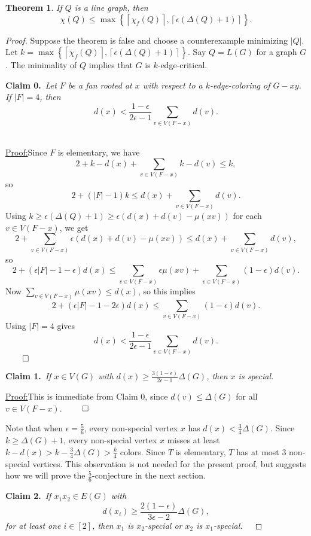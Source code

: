 \documentclass[12pt]{amsart}
\theoremstyle{plain}
\newtheorem{thm}{Theorem}
\theoremstyle{definition}
\theoremstyle{remark}
\newcommand{\set}[1]{\left\{ #1 \right\}}
\newcommand{\card}[1]{\left|#1\right|}
\newcommand{\ceil}[1]{\left\lceil#1\right\rceil}
\newcommand{\irange}[1]{\left[#1\right]}
\newcommand{\parens}[1]{\left( #1 \right)}
\newcommand{\claim}[2]{{\noindent\bf Claim #1.}~{\it #2}~~}
\newenvironment{claimproof}[1]{\par\noindent\underline{Proof:}\space#1}{\leavevmode\unskip\penalty9999
\hbox{}\nobreak\hfill\quad\hbox{$\qed$}}
\begin{document}
\begin{thm}
If $Q$ is a line graph, then
\[\chi(Q) \le \max\set{\ceil{\chi_f(Q)}, \ceil{\epsilon(\Delta(Q) + 1)}}.\]
\end{thm}
\begin{proof}
Suppose the theorem is false and choose a counterexample minimizing $\card{Q}$.
Let $k = \max\set{\ceil{\chi_f(Q)}, \ceil{\epsilon(\Delta(Q) + 1)}}$. Say $Q =
L(G)$ for a graph $G$. The minimality of $Q$ implies that $G$ is $k$-edge-critical.

\claim{0}{Let $F$ be a fan rooted at $x$ with respect to a $k$-edge-coloring of $G - xy$.  If $|F| = 4$, then
\[d(x) < \frac{1-\epsilon}{2\epsilon -1}\sum_{v \in V(F-x)} d(v).\]}
\begin{claimproof}
Since $F$ is elementary, we have
\[2 + k-d(x) + \sum_{v \in V(F-x)} k - d(v) \le k,\]
so
\[2 + (|F| - 1)k \le d(x) + \sum_{v \in V(F-x)} d(v).\]
Using $k \ge \epsilon(\Delta(Q) + 1) \ge \epsilon(d(x) + d(v) - \mu(xv))$ for each $v \in V(F-x)$, we get
\[2 + \sum_{v \in V(F-x)}\epsilon(d(x) + d(v) - \mu(xv)) \le d(x) + \sum_{v \in V(F-x)} d(v),\]
so
\[2 + \parens{\epsilon|F| - 1 - \epsilon}d(x) \le \sum_{v \in V(F-x)} \epsilon\mu(xv) + \sum_{v \in V(F-x)} (1-\epsilon)d(v).\]
Now $\sum_{v \in V(F-x)} \mu(xv) \le d(x)$, so this implies
\[2 + \parens{\epsilon|F| - 1 - 2\epsilon}d(x) \le \sum_{v \in V(F-x)} (1-\epsilon)d(v).\]
Using $|F| = 4$ gives
\[d(x) < \frac{1-\epsilon}{2\epsilon -1}\sum_{v \in V(F-x)} d(v).\]
\end{claimproof}
\bigskip

\claim{1}{If $x \in V(G)$ with $d(x) \ge \frac{3(1-\epsilon)}{2\epsilon -1}\Delta(G)$, then $x$ is special.}

\begin{claimproof}
This is immediate from Claim 0, since $d(v)\le \Delta(G)$ for all $v\in V(F-x)$.
\end{claimproof}
\bigskip

Note that when $\epsilon=\frac56$, every non-special vertex $x$ has
$d(x)<\frac34\Delta(G)$.  Since $k\ge \Delta(G)+1$, every non-special vertex $x$ misses
at least $k-d(x)> k-\frac34\Delta(G)> \frac{k}4$ colors.
Since $T$ is elementary, $T$ has at most 3 non-special vertices.
This observation is not needed for the present proof, but suggests how we will
prove the $\frac56$-conjecture in the next section.
\bigskip

\claim{2}{If $x_1x_2 \in E(G)$ with \[d(x_i) \ge \frac{2(1-\epsilon)}{3\epsilon - 2}\Delta(G),\] for at least one $i \in \irange{2}$, then $x_1$ is $x_2$-special or $x_2$ is $x_1$-special.}


\end{proof}
\end{document}
